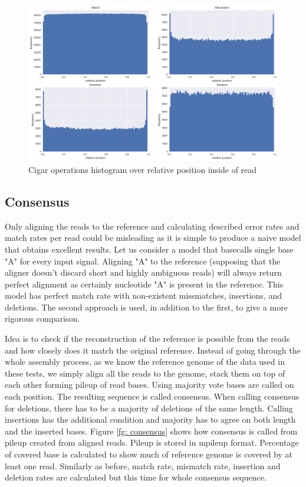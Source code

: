 \documentclass[times, utf8, diplomski, numeric, english]{fer}
\begin{document}
\begin{figure}[!ht]
	\begin{center}
		\includegraphics[width=1\textwidth]{./imgs/operation_distributed_r9.png}
		\caption{Cigar operations histogram over relative position inside of read}
		\label{fg:cigar_op_dist}
	\end{center}
\end{figure}





\subsection{Consensus}

Only aligning the reads to the reference and calculating described error rates and match rates per read could be misleading as it is simple to produce a naive model that obtains excellent results. Let us consider a model that basecalls single base "A" for every input signal. Aligning "A" to the reference (supposing that the aligner doesn't discard short and highly ambiguous reads) will always return perfect alignment as certainly nucleotide "A" is present in the reference. This model has perfect match rate with non-existent missmatches, insertions, and deletions.  The second approach is used, in addition to the first, to give a more rigorous comparison.

Idea is to check if the reconstruction of the reference is possible from the reads and how closely does it match the original reference. Instead of going through the whole assembly process, as we know the reference genome of the data used in these tests, we simply align all the reads to the genome, stack them on top of each other forming pileup of read bases. Using majority vote bases are called on each position. The resulting sequence is called consensus. When calling consensus for deletions,  there has to be a majority of deletions of the same length. Calling insertions has the additional condition and majority has to agree on both length and the inserted bases. Figure \ref{fg: consensus} shows how consensus is called from pileup created from aligned reads. Pileup is stored in mpileup format.  
Percentage of covered base is calculated to show much of reference genome is covered by at least one read. Similarly as before, match rate, mismatch rate, insertion and deletion rates are calculated but this time for whole consensus sequence. 
\end{document}
